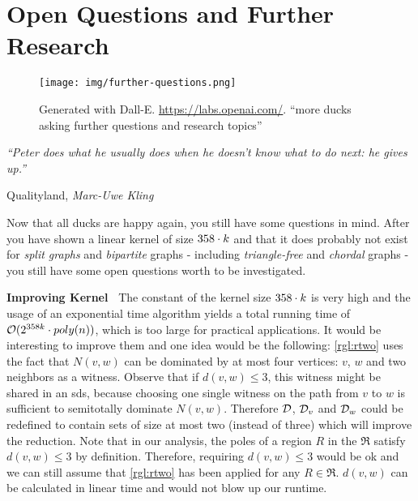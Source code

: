 \chapter{Open Questions and Further Research}\label{ch:closing}

\vspace*{-50pt}

\begin{figure}[ht]
        \texttt{[image: img/further-questions.png]}
        \captionsetup{textformat=empty,labelformat=blank}
        \caption[Generated with Dalle-E. Knowledge Cutoff 09-2022]{Generated with Dall-E. \url{https://labs.openai.com/}. ``more ducks asking further questions and research topics''}
\end{figure}

\epigraph{\itshape ``Peter does what he usually does when he doesn’t know what to do next: he gives up.''}{Qualityland, \textit{Marc-Uwe Kling}}

Now that all ducks are happy again, you still have some questions in mind.
After you have shown a linear kernel of size $358 \cdot k$ and that it does probably not exist for \textit{split graphs} and \textit{bipartite} graphs - including \textit{triangle-free} and \textit{chordal} graphs - you still have some open questions worth to be investigated.


\noindent \textbf{Improving Kernel~}
The constant of the kernel size $358 \cdot k$ is very high and the usage of an exponential time algorithm yields a total running time of  $\mathcal{O}(2^{358 k} \cdot poly(n))$, which is too large for practical applications.
It would be interesting to improve them and one idea would be the following:
\cref{rgl:rtwo} uses the fact that $N(v,w)$ can be dominated by at most four vertices: $v$, $w$ and two neighbors as a witness.
Observe that if $d(v,w) \leq 3$, this witness might be shared in an sds, because choosing one single witness on the path from $v$ to $w$ is sufficient to semitotally dominate $N(v,w)$.
Therefore $\mathcal{D}$, $\mathcal{D}_{v}$ and $\mathcal{D}_{w}$ could be redefined to contain sets of size at most two (instead of three) which will improve the reduction. 
Note that in our analysis, the poles of a region $R$ in the \dreg $\mathfrak{R}$ satisfy $d(v,w) \leq 3$ by definition.
Therefore, requiring $d(v,w) \leq 3$ would be ok and we can still assume that \cref{rgl:rtwo} has been applied for any $R \in \mathfrak{R}$.
$d(v,w)$ can be calculated in linear time and would not blow up our runtime.

